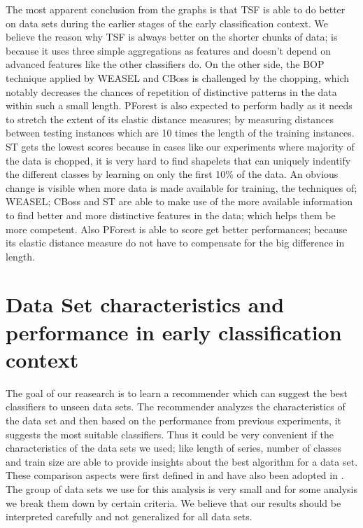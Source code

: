 The most apparent conclusion from the graphs is that TSF is able to do better on data sets during the earlier stages of the early classification context.
We believe the reason why TSF is always better on the shorter chunks of data; is because it uses three simple aggregations as features and doesn't depend on advanced features like the other classifiers do.
On the other side, the BOP technique applied by WEASEL and CBoss is challenged by the chopping, which notably decreases the chances of repetition of distinctive patterns in the data within such a small length.
PForest is also expected to perform badly as it needs to stretch the extent of its elastic distance measures; by measuring distances between testing instances which are 10 times the length of the training instances.
ST gets the lowest scores because in cases like our experiments where majority of the data is chopped, it is very hard to find shapelets that can uniquely indentify the different classes by learning on only the first 10\% of the data.
An obvious change is visible when more data is made available for training, the techniques of; WEASEL; CBoss and ST are able to make use of the more available information
to find better and more distinctive features in the data; which helps them be more competent.
Also PForest is able to score get better performances; because its elastic distance measure do not have to compensate for the big difference in length.


\section{Data Set characteristics and performance in early classification context}
\label{SectionDataCharacteristicsandPerformance}
The goal of our reasearch is to learn a recommender which can suggest the best classifiers to unseen data sets.
The recommender analyzes the characteristics of the data set and then based on the performance from previous experiments, it suggests the most suitable classifiers.
Thus it could be very convenient if the characteristics of the data sets we used; like length of series, number of classes and train size are able to provide insights about the best algorithm for a data set.
These comparison aspects were first defined in \cite{bagnall2017great} and have also been adopted in \cite{fawaz2019deepreview}.
The group of data sets we use for this analysis is very small and for some analysis we break them down by certain criteria.
We believe that our results should be interpreted carefully and not generalized for all data sets.

